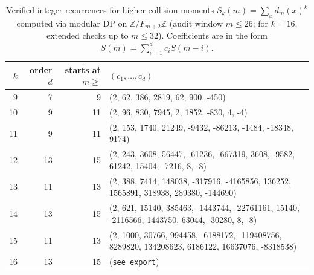 \begin{table}[H]
\centering
\scriptsize
\setlength{\tabcolsep}{6pt}
\caption{Verified integer recurrences for higher collision moments $S_k(m)=\sum_x d_m(x)^k$ computed via modular DP on $\mathbb{Z}/F_{m+2}\mathbb{Z}$ (audit window $m\le 26$; for $k=16$, extended checks up to $m\le 32$). Coefficients are in the form $S(m)=\sum_{i=1}^d c_i S(m-i)$.}
\label{tab:fold_collision_moment_recursions_9_16}
\begin{tabular}{r r r l}
\toprule
$k$ & order $d$ & starts at $m\ge$ & $(c_1,\dots,c_d)$\\
\midrule
9 & 7 & 9 & (2, 62, 386, 2819, 62, 900, -450)\\
10 & 9 & 11 & (2, 96, 830, 7945, 2, 1852, -830, 4, -4)\\
11 & 9 & 11 & (2, 153, 1740, 21249, -9432, -86213, -1484, -18348, 9174)\\
12 & 13 & 15 & (2, 243, 3608, 56447, -61236, -667319, 3608, -9582, 61242, 15404, -7216, 8, -8)\\
13 & 11 & 13 & (2, 388, 7414, 148038, -317916, -4165856, 136252, 1565891, 318938, 289380, -144690)\\
14 & 13 & 15 & (2, 621, 15140, 385463, -1443744, -22761161, 15140, -2116566, 1443750, 63044, -30280, 8, -8)\\
15 & 11 & 13 & (2, 1000, 30766, 994458, -6188172, -119408756, 8289820, 134208623, 6186122, 16637076, -8318538)\\
16 & 13 & 15 & (\texttt{see export})\\
\bottomrule
\end{tabular}
\end{table}
